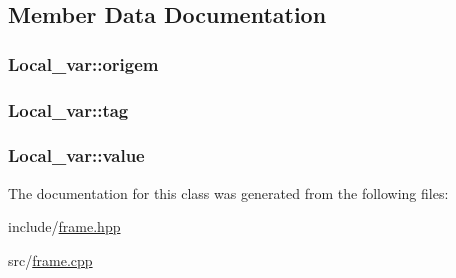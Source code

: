 \subsection{Member Data Documentation}
\hypertarget{classLocal__var_a4ae925fbb18fdffdbed6a5a0b89ce155}{
\subsubsection[{origem}]{ Local\+\_\+var\+::origem}}\label{classLocal__var_a4ae925fbb18fdffdbed6a5a0b89ce155}
\hypertarget{classLocal__var_a280e6832190995ebfda29a854f2525c1}{
\subsubsection[{tag}]{ Local\+\_\+var\+::tag}}\label{classLocal__var_a280e6832190995ebfda29a854f2525c1}
\hypertarget{classLocal__var_a347232c5e4135f417b2656bb881baaa8}{
\subsubsection[{value}]{ Local\+\_\+var\+::value}}\label{classLocal__var_a347232c5e4135f417b2656bb881baaa8}


The documentation for this class was generated from the following files\+:\begin{DoxyCompactItemize}
\item 
include/\hyperlink{frame_8hpp}{frame.\+hpp}\item 
src/\hyperlink{frame_8cpp}{frame.\+cpp}\end{DoxyCompactItemize}
